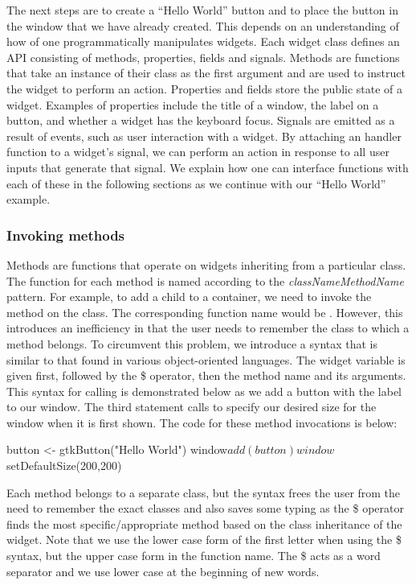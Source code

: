 \documentclass[article,shortnames]{jss}
\begin{document}
The next steps are to create a ``Hello World'' button and to place the
button in the window that we have already created. This depends on an
understanding of how of one programmatically manipulates widgets.
Each widget class defines an API consisting of methods, properties,
fields and signals. Methods are functions that take an instance of
their class as the first argument and are used to instruct the widget
to perform an action. Properties and fields store the public state of
a widget. Examples of properties include the title of a window, the
label on a button, and whether a widget has the keyboard focus.
Signals are emitted as a result of events, such as user interaction
with a widget.
By attaching an  handler function to a widget's signal, we
can
perform an action in response to all user inputs that generate that
signal. We explain how one can interface  functions with
each of these in the following sections as we continue with our
``Hello World'' example.

\subsubsection{Invoking methods}

Methods are functions that operate on widgets inheriting from a
particular class.  The  function for each  method
is named according to the \emph{classNameMethodName} pattern. For
example, to add a child to a container, we need to invoke the
 method on the  class.  The corresponding
function name would be .  However, this
introduces an inefficiency in that the user needs to remember the
class to which a method belongs. To circumvent this problem, we
introduce a syntax that is similar to that found in various
object-oriented languages. The widget variable is given first,
followed by the \$ operator, then the method name and its
arguments. This syntax for calling  is
demonstrated below as we add a button with the label  to our window.  The third statement calls
 to specify our desired size for the
window when it is first shown. The code for these method invocations
is below:
\begin{Code}
button <- gtkButton("Hello World")
window$add(button)
window$setDefaultSize(200,200)
\end{Code}
Each method belongs to a separate
class, but the syntax frees the user from the need to remember the
exact classes and also saves some typing as 
the \$ operator finds the most specific/appropriate method based on
the class inheritance of the widget.
Note that we use the lower case form of the first letter when using
the \$ syntax, but the upper case form in the
 function name. The \$ acts as a word
separator and we use lower case at the beginning of new words.
\end{document}
